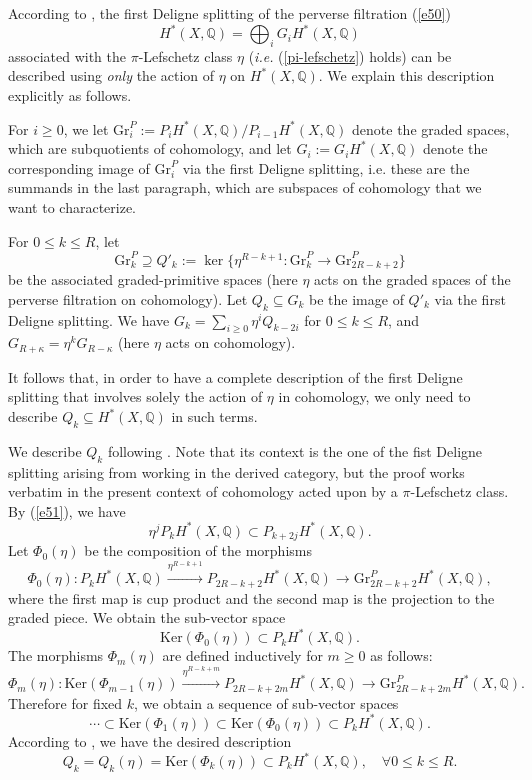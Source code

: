 \documentclass[11pt]{amsart}
\theoremstyle{plain}
\theoremstyle{definition}
\theoremstyle{remark}
\newcommand{\BQ}{{\mathbb{Q}}}
\begin{document}


According to \cite{dC}, the first Deligne splitting of the perverse filtration (\ref{e50})   
\[
H^*(X,\BQ) = \bigoplus_{i}G_iH^*(X, \BQ)
\]
 associated with the $\pi$-Lefschetz class $\eta$ (\emph{i.e.} (\ref{pi-lefschetz}) holds)
can be described using \emph{only} the action of $\eta$ on $H^*(X,\BQ)$.  We explain this description explicitly as follows.

For $i  \geq 0$, we let $\mathrm{Gr}^P_i:=P_iH^*(X,\BQ)/P_{i-1}H^*(X,\BQ)$ denote the graded spaces, which are subquotients of cohomology, and let $G_i:= G_i H^*(X,\BQ)$ denote the corresponding image of $\mathrm{Gr}^P_i$ via the first Deligne splitting, i.e. these are the summands in the last paragraph, which are subspaces of cohomology that we want to characterize.


For $0 \leq k \leq {R}$, let 
\[
\mathrm{Gr}^P_k\supseteq Q'_k:= 
\ker \{\eta^{{R}-k+1}: \mathrm{Gr}^P_{k}\to \mathrm{Gr}^P_{2{R} -k +2}\}
\]
be the associated graded-primitive spaces (here $\eta$ acts on the graded spaces of the perverse filtration on cohomology).
Let $Q_k \subseteq G_k$ be the image of $Q'_k$ via the first Deligne splitting. We have
$G_k= \sum_{i \geq 0} \eta^i Q_{k-2i}$ for $0 \leq k \leq {R}$, and $G_{{R}+\kappa}=\eta^k G_{{R}-\kappa}$
(here $\eta$ acts on cohomology).

It follows that, in order to have a complete description of the first Deligne splitting that involves solely
the action of $\eta$ in cohomology, we only need to describe $Q_k \subseteq H^*(X,\BQ)$ in such terms.

We describe $Q_k$ following \cite[Section 2.7]{dCM4}. Note that its context is the one of the fist Deligne splitting arising from working in the derived category, but the proof works verbatim in the present context of cohomology acted upon by  a $\pi$-Lefschetz class. By (\ref{e51}), we have
\[
\eta^j P_k H^*(X, \BQ) \subset P_{k+2j}H^*(X, \BQ).
\]
Let $\Phi_0 (\eta)$ be the composition of the morphisms
\[
\Phi_0 (\eta) : P_kH^*(X, \BQ) \xrightarrow{\eta^{{ R}-k+1}} P_{2{ R}-k+2}H^*(X, \BQ) \to \mathrm{Gr}_{2{ R}-k+2}^PH^*(X, \BQ),
\]
where the first map is cup product and the second map is the projection to the graded piece. We obtain the sub-vector space
\[
\mathrm{Ker}(\Phi_0 (\eta)) \subset P_kH^*(X, \BQ).
\]
The morphisms $\Phi_m (\eta)$ are defined inductively for $m\geq 0$ as follows:
\[
\Phi_m (\eta) : \mathrm{Ker}(\Phi_{m-1} (\eta)) \xrightarrow{\eta^{{ R} -k+m}} P_{2{R} -k+2m}H^*(X, \BQ) \to \mathrm{Gr}_{2 { R} -k+2m}^PH^*(X, \BQ).
\]
Therefore for fixed $k$, we obtain a sequence of sub-vector spaces
\[
\cdots \subset \mathrm{Ker}(\Phi_1(\eta)) \subset \mathrm{Ker}(\Phi_0 (\eta) ) \subset P_kH^*(X, \BQ). 
\]
According to \cite[Proposition 2.7.1]{dCM4}, we have the desired description
\[
Q_k = Q_k (\eta)= \mathrm{Ker}(\Phi_k (\eta)) \subset P_kH^*(X, \BQ), \quad \forall 0 \leq k \leq { R}.
\]
\end{document}
